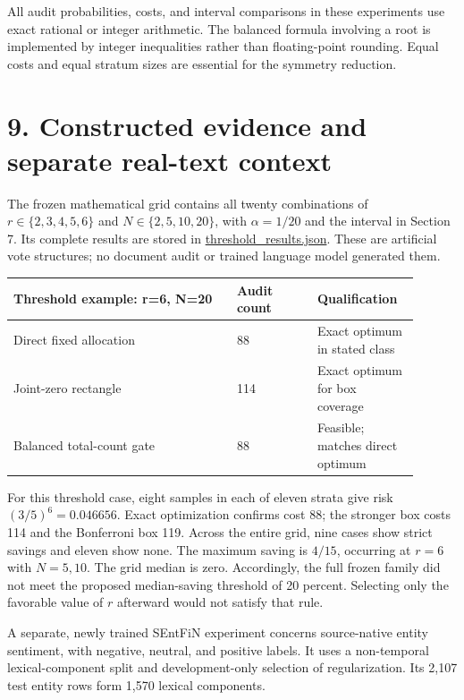 \documentclass[11pt]{article}
\begin{document}
All audit probabilities, costs, and interval comparisons in these experiments use exact rational or integer arithmetic. The balanced formula involving a root is implemented by integer inequalities rather than floating-point rounding. Equal costs and equal stratum sizes are essential for the symmetry reduction.

\section*{9. Constructed evidence and separate real-text context}

The frozen mathematical grid contains all twenty combinations of $r\in\{2,3,4,5,6\}$ and $N\in\{2,5,10,20\}$, with $\alpha=1/20$ and the interval in Section 7. Its complete results are stored in \href{../planning/threshold_results.json}{threshold\_results.json}. These are artificial vote structures; no document audit or trained language model generated them.

\begin{center}
\begin{tabular}{@{}p{0.50\linewidth}p{0.18\linewidth}p{0.22\linewidth}@{}}
\toprule
Threshold example: r=6, N=20 & Audit count & Qualification \\
\midrule
Direct fixed allocation & 88 & Exact optimum in stated class \\
Joint-zero rectangle & 114 & Exact optimum for box coverage \\
Balanced total-count gate & 88 & Feasible; matches direct optimum \\
\bottomrule
\end{tabular}
\end{center}

For this threshold case, eight samples in each of eleven strata give risk $(3/5)^6=0.046656$. Exact optimization confirms cost 88; the stronger box costs 114 and the Bonferroni box 119. Across the entire grid, nine cases show strict savings and eleven show none. The maximum saving is $4/15$, occurring at $r=6$ with $N=5,10$. The grid median is zero. Accordingly, the full frozen family did not meet the proposed median-saving threshold of 20 percent. Selecting only the favorable value of $r$ afterward would not satisfy that rule.

A separate, newly trained SEntFiN experiment concerns source-native entity sentiment, with negative, neutral, and positive labels. It uses a non-temporal lexical-component split and development-only selection of regularization. Its 2,107 test entity rows form 1,570 lexical components.
\end{document}
